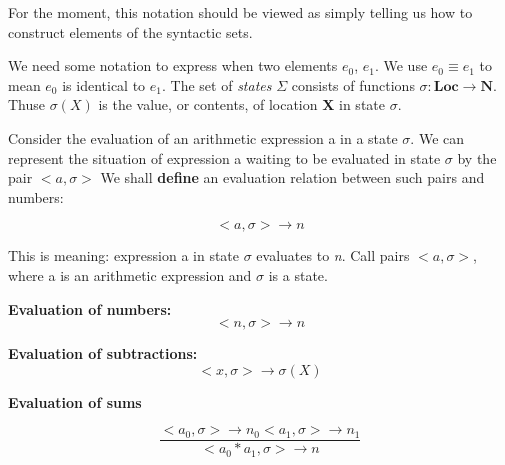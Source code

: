 \documentclass[a4paper, 12pt]{article}
\begin{document}
    For the moment, this notation should be viewed as simply telling us how to construct elements of the syntactic sets.

    We need some notation to express when two elements \textit{$e_0$}, \textit{$e_1$}. 
    We use $e_0 \equiv e_1$ to mean \textit{$e_0$} is identical to \textit{$e_1$}.
    The set of \textit{states} $\Sigma$ consists of functions $\sigma: \textbf{Loc} \rightarrow \textbf{N}$.
    Thuse $\sigma(X)$ is the value, or contents, of location \textbf{X} in state $\sigma$.

    Consider the evaluation of an arithmetic expression a in a state $\sigma$.
    We can represent the situation of expression a waiting to be evaluated in state $\sigma$ by the pair $<a, \sigma>$
    We shall \textbf{define} an evaluation relation between such pairs and numbers:

        \[
            <a, \sigma> \rightarrow n
        \]

    This is meaning: expression a in state $\sigma$ evaluates to \textit{n}.
    Call pairs $<a, \sigma>$, where a is an arithmetic expression and $\sigma$ is a state.

    \textbf{Evaluation of numbers:}
        \[
            <n, \sigma> \rightarrow n
        \]

    \textbf{Evaluation of subtractions:}
        \[
            <x, \sigma> \rightarrow \sigma(X)
        \]

    \textbf{Evaluation of sums}
    
        \[
            \frac{<a_0, \sigma> \rightarrow n_0 <a_1, \sigma> \rightarrow n_1}{<a_0 * a_1, \sigma> \rightarrow n}
        \]
\end{document}
